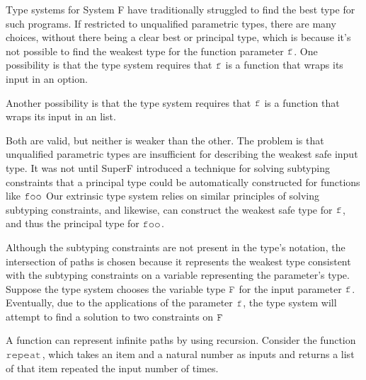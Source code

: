 \documentclass[table,dvipsnames,acmsmall]{acmart}
\theoremstyle{definition}
\begin{document}
\noindent
Type systems for System F have traditionally struggled to find the best
type for such programs. If restricted to unqualified parametric types, there are many choices,
without there being a clear best or principal type, 
which is because it's not possible to find the weakest type for the function parameter
$\J{f}$.
One possibility is that the type system requires that $\J{f}$ is a function that wraps its
input in an option. 


\noindent
Another possibility is that the type system requires that $\J{f}$ is a function that wraps its
input in an list. 


\noindent
Both are valid, but neither is weaker than the other. The problem is that unqualified parametric
types are insufficient for describing the weakest safe input type.
It was not until SuperF introduced a technique for solving subtyping constraints
that a principal type could be automatically constructed for functions like $\J{foo}$
Our extrinsic type system relies on similar principles of solving subtyping constraints,
and likewise, can construct the weakest safe type for $\J{f}$, and thus the principal type for $\J{foo}$.


\noindent
Although the subtyping constraints are not present in the type's notation,
the intersection of paths is chosen because it represents the weakest type
consistent with the subtyping constraints on a variable representing the parameter's type. 
Suppose the type system chooses the variable type $\J{F}$ for the input parameter $\J{f}$.
Eventually, due to the applications of the parameter $\J{f}$, the type
system will attempt to find a solution to two constraints on $\J{F}$


A function can represent infinite paths by using recursion.
Consider the function $\J{repeat}$, which takes an item and a natural number
as inputs and returns a list of that item repeated the input number of times.

\examp{
  \J{def repeat = [x => loop([self => [}
  \\
  \I \J{[zero;@ => nil;@]}
  \\
  \I \J{[succ;n => <cons>(x,self(n))]}
  \\
  \J{])]}
}
\end{document}
